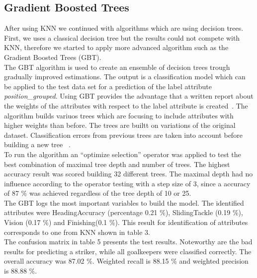 \subsection{Gradient Boosted Trees}
After using KNN we continued with algorithms which are using decision trees. First, we uses a classical decision tree but the results could not compete with KNN, therefore we started to apply more advanced algorithm such as the Gradient Boosted Trees (GBT).\\
The GBT algorithm is used to create an ensemble of decision trees trough gradually improved estimations. The output is a classification model which can be applied to the test data set for a prediction of the label attribute\textit{ position\_grouped}. Using GBT provides the advantage that a written report about the weights of the attributes with respect to the label attribute is created~\cite{ref_rapidminergbt}. The algorithm builds variuos trees which are focusing to include attributes with higher weights than before. The trees are builtt on variations of the original dataset. Classification errors from previous trees are taken into account before building a new tree ~\cite{ref_towardsGBT}.\\
To run the algorithm an ``optimize selection'' operator was applied to test the best combination of maximal tree depth and number of trees.  The highest accuracy result was scored building 32 different trees. The maximal depth had no influence according to the operator testing with a step size of 3, since a accuracy of 87 \% was achieved regardless of the tree depth of 10 or 25.\\
The GBT logs the most important variables to build the model. The identified attributes were HeadingAccuracy (percentage 0.21 \%), SlidingTackle (0.19 \%), Vision (0.17 \%) and Finishing(0.1 \%). This result for identification of attributes corresponds to one from KNN shown in table 3.\\
The confusion matrix in table 5 presents the test results. Noteworthy are the bad results for predicting a striker, while all goalkeepers were classified correctly. The overall accuracy was 87.02 \%. Weighted recall is 88.15 \% and weighted precision is 88.88 \%. \\
